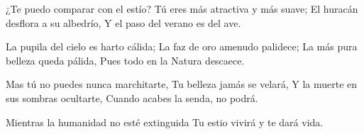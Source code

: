 \startlanguage[es]
\startlines
¿Te puedo comparar con el estío?
Tú eres más atractiva y más suave;
El huracán desflora a su albedrío,
Y el paso del verano es del ave.

La pupila del cielo es harto cálida;
La faz de oro amenudo palidece;
La más pura belleza queda pálida,
Pues todo en la Natura descaece.

Mas tú no puedes nunca marchitarte,
Tu belleza jamás se velará,
Y la muerte en sus sombras ocultarte,
Cuando acabes la senda, no podrá.

Mientras la humanidad no esté extinguida
Tu estio vivirá y te dará vida.
\stoplines
\stoplanguage
